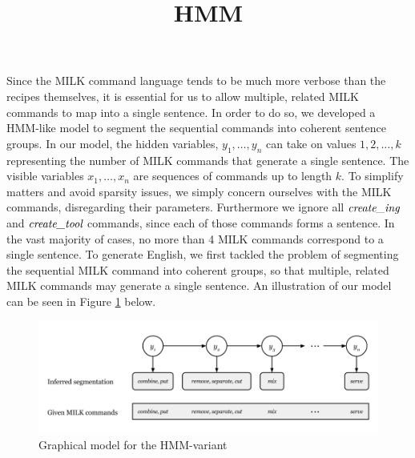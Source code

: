 \documentclass[11pt]{article}
\title{HMM}
\author{}
\date{}
\begin{document}
\maketitle

Since the MILK command language tends to be much more verbose than the recipes themselves, it is essential for us to allow multiple, related MILK commands to map into a single sentence. In order to do so, we developed a HMM-like model to segment the sequential commands into coherent sentence groups. In our model, the hidden variables, $y_1,\dots,y_n$ can take on values $1,2,\dots,k$ representing the number of MILK commands that generate a single sentence. The visible variables $x_1,\dots,x_n$ are sequences of commands up to length $k$. To simplify matters and avoid sparsity issues, we simply concern ourselves with the MILK commands, disregarding their parameters. Furthermore we ignore all $\emph{create\_ing}$ and $\emph{create\_tool}$ commands, since each of those commands forms a sentence. In the vast majority of cases, no more than 4 MILK commands correspond to a single sentence. To generate English, we first tackled the problem of segmenting the sequential MILK command into coherent groups, so that multiple, related MILK commands may generate a single sentence. An illustration of our model can be seen in Figure \ref{hmm_gm} below.\\

\begin{figure}[h!]
\begin{center}
\includegraphics[width=1\textwidth]{hmm_graphical_model}
\end{center}
\caption{Graphical model for the HMM-variant}
\label{hmm_gm}
\end{figure}

\end{document}
